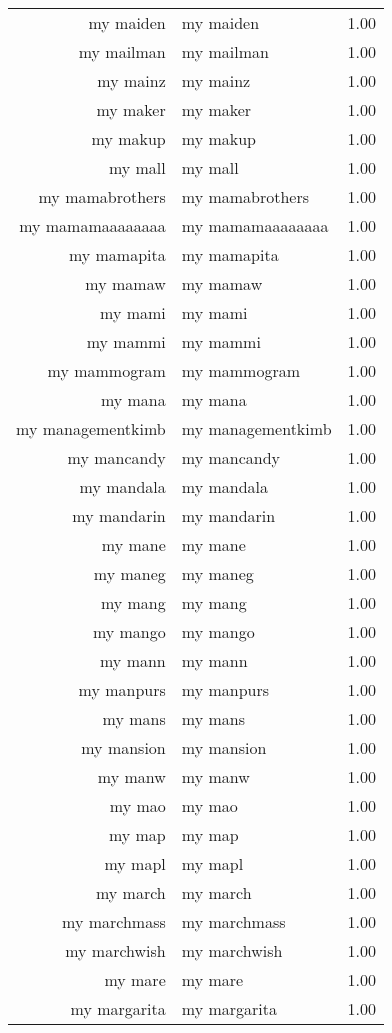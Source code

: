 \begin{table}[ht]
\begin{tabular}{rlr}
  my maiden & my maiden & 1.00 \\ 
  my mailman & my mailman & 1.00 \\ 
  my mainz & my mainz & 1.00 \\ 
  my maker & my maker & 1.00 \\ 
  my makup & my makup & 1.00 \\ 
  my mall & my mall & 1.00 \\ 
  my mamabrothers & my mamabrothers & 1.00 \\ 
  my mamamaaaaaaaa & my mamamaaaaaaaa & 1.00 \\ 
  my mamapita & my mamapita & 1.00 \\ 
  my mamaw & my mamaw & 1.00 \\ 
  my mami & my mami & 1.00 \\ 
  my mammi & my mammi & 1.00 \\ 
  my mammogram & my mammogram & 1.00 \\ 
  my mana & my mana & 1.00 \\ 
  my managementkimb & my managementkimb & 1.00 \\ 
  my mancandy & my mancandy & 1.00 \\ 
  my mandala & my mandala & 1.00 \\ 
  my mandarin & my mandarin & 1.00 \\ 
  my mane & my mane & 1.00 \\ 
  my maneg & my maneg & 1.00 \\ 
  my mang & my mang & 1.00 \\ 
  my mango & my mango & 1.00 \\ 
  my mann & my mann & 1.00 \\ 
  my manpurs & my manpurs & 1.00 \\ 
  my mans & my mans & 1.00 \\ 
  my mansion & my mansion & 1.00 \\ 
  my manw & my manw & 1.00 \\ 
  my mao & my mao & 1.00 \\ 
  my map & my map & 1.00 \\ 
  my mapl & my mapl & 1.00 \\ 
  my march & my march & 1.00 \\ 
  my marchmass & my marchmass & 1.00 \\ 
  my marchwish & my marchwish & 1.00 \\ 
  my mare & my mare & 1.00 \\ 
  my margarita & my margarita & 1.00 \\ 

\end{tabular}
\end{table}
